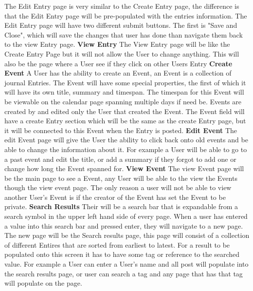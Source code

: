\documentclass[letterpaper, 10, draftclsnofoot, onecolumn]{IEEEtran}
\begin{document}
\indent The Edit Entry page is very similar to the Create Entry page, the difference is that the Edit Entry page will be pre-populated with the entries information. The Edit Entry page will have two different submit buttons. The first is "Save and Close", which will save the changes that user has done than navigate them back to the view Entry page.
\newline
\newline
\textbf{View Entry}
\newline
\indent The View Entry page will be like the Create Entry Page but it will not allow the User to change anything. This will also be the page where a User see if they click on other Users Entry
\newline
\newline
\textbf{Create Event}
\newline
\indent A User has the ability to create an Event, an Event is a collection of journal Entries. The Event will have some special properties, the first of which it will have its own title, summary and timespan. The timespan for this Event will be viewable on the calendar page spanning multiple days if need be. Events are created by and edited only the User that created the Event. The Event field will have a create Entry section which will be the same as the create Entry page, but it will be connected to this Event when the Entry is posted. 
\newline
\newline
\textbf{Edit Event}
\newline
\indent The edit Event page will give the User the ability to click back onto old events and be able to change the information about it. For example a User will be able to go to a past event and edit the title, or add a summary if they forgot to add one or change how long the Event spanned for.
\newline
\newline
\textbf{View Event}
\newline
\indent The view Event page will be the main page to see a Event, any User will be able to the view the Events though the view event page. The only reason a user will not be able to view another User's Event is if the creator of the Event has set the Event to be private.
\newline
\newline
\textbf{Search Results}
\newline
\indent Their will be a search bar that is expandable from a search symbol in the upper left hand side of every page. When a user has entered a value into this search bar and pressed enter, they will navigate to a new page. The new page will be the Search results page, this page will consist of a collection of different Entires that are sorted from earliest to latest. For a result to be populated onto this screen it has to have some tag or reference to the searched value. For example a User can enter a User's name and all post will populate into the search results page, or user can search a tag and any page that has that tag will populate on the page.
\end{document}
